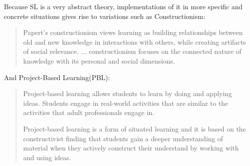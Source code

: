 Because SL is a very abstract theory, implementations of it in more specific and
concrete situations gives rise to variations such as Constructionism:

\begin{quote}
    Papert's constructionism views learning as building relationships between old
    and new knowledge in interactions with others, while creating artifacts of
    social relevance.
    ...
    constructionism focuses on the connected nature of knowledge with its
    personal and social dimensions.
    \cite{education:yasmin__constructionism} 
\end{quote}

And Project-Based Learning(PBL):

\begin{quotation}
    Project-based learning allows students to learn by doing and applying ideas.
    Students engage in real-world activities that are similar to the activities
    that adult professionals engage in.
    
    Project-based learning is a form of situated learning \cite{education:greeno__learning_activity} 
    and it is based on the constructivist finding that students gain a deeper
    understanding of material when they actively construct their understand by
    working with and using ideas.
    \cite{education:joseph_phyllis__pbl} 
\end{quotation}

